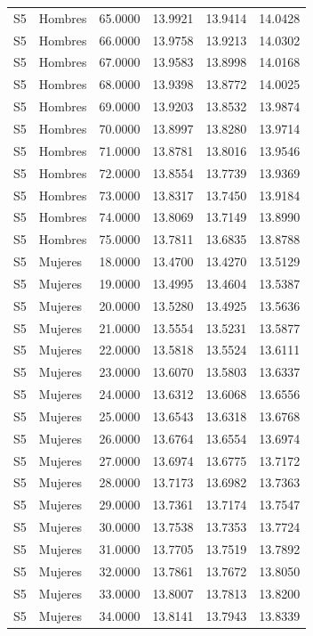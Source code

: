 \begin{longtable}{llrrrr}
S5 & Hombres & 65.0000 & 13.9921 & 13.9414 & 14.0428 \\
S5 & Hombres & 66.0000 & 13.9758 & 13.9213 & 14.0302 \\
S5 & Hombres & 67.0000 & 13.9583 & 13.8998 & 14.0168 \\
S5 & Hombres & 68.0000 & 13.9398 & 13.8772 & 14.0025 \\
S5 & Hombres & 69.0000 & 13.9203 & 13.8532 & 13.9874 \\
S5 & Hombres & 70.0000 & 13.8997 & 13.8280 & 13.9714 \\
S5 & Hombres & 71.0000 & 13.8781 & 13.8016 & 13.9546 \\
S5 & Hombres & 72.0000 & 13.8554 & 13.7739 & 13.9369 \\
S5 & Hombres & 73.0000 & 13.8317 & 13.7450 & 13.9184 \\
S5 & Hombres & 74.0000 & 13.8069 & 13.7149 & 13.8990 \\
S5 & Hombres & 75.0000 & 13.7811 & 13.6835 & 13.8788 \\
S5 & Mujeres & 18.0000 & 13.4700 & 13.4270 & 13.5129 \\
S5 & Mujeres & 19.0000 & 13.4995 & 13.4604 & 13.5387 \\
S5 & Mujeres & 20.0000 & 13.5280 & 13.4925 & 13.5636 \\
S5 & Mujeres & 21.0000 & 13.5554 & 13.5231 & 13.5877 \\
S5 & Mujeres & 22.0000 & 13.5818 & 13.5524 & 13.6111 \\
S5 & Mujeres & 23.0000 & 13.6070 & 13.5803 & 13.6337 \\
S5 & Mujeres & 24.0000 & 13.6312 & 13.6068 & 13.6556 \\
S5 & Mujeres & 25.0000 & 13.6543 & 13.6318 & 13.6768 \\
S5 & Mujeres & 26.0000 & 13.6764 & 13.6554 & 13.6974 \\
S5 & Mujeres & 27.0000 & 13.6974 & 13.6775 & 13.7172 \\
S5 & Mujeres & 28.0000 & 13.7173 & 13.6982 & 13.7363 \\
S5 & Mujeres & 29.0000 & 13.7361 & 13.7174 & 13.7547 \\
S5 & Mujeres & 30.0000 & 13.7538 & 13.7353 & 13.7724 \\
S5 & Mujeres & 31.0000 & 13.7705 & 13.7519 & 13.7892 \\
S5 & Mujeres & 32.0000 & 13.7861 & 13.7672 & 13.8050 \\
S5 & Mujeres & 33.0000 & 13.8007 & 13.7813 & 13.8200 \\
S5 & Mujeres & 34.0000 & 13.8141 & 13.7943 & 13.8339 \\

\end{longtable}

